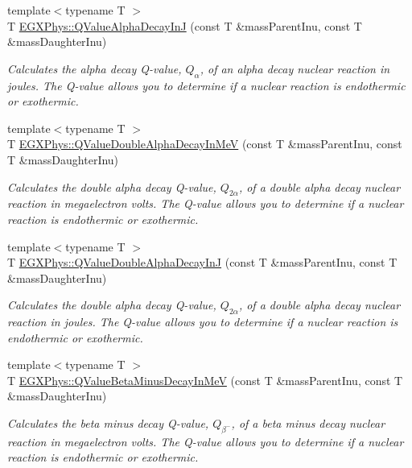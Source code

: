 \begin{DoxyCompactItemize}
{\footnotesize template$<$typename T $>$ }\\T \hyperlink{group___e_g_x_phys-_q_value_ga3e767be294dae24e1df18e7ccb8989e6}{E\+G\+X\+Phys\+::\+Q\+Value\+Alpha\+Decay\+InJ} (const T \&mass\+Parent\+Inu, const T \&mass\+Daughter\+Inu)
\begin{DoxyCompactList}\small\item\em Calculates the alpha decay Q-\/value, $Q_{\alpha}$, of an alpha decay nuclear reaction in joules. The Q-\/value allows you to determine if a nuclear reaction is endothermic or exothermic. \end{DoxyCompactList}\item 
{\footnotesize template$<$typename T $>$ }\\T \hyperlink{group___e_g_x_phys-_q_value_ga9bc6e8f493ee3769eb6eea0ac7cbdc61}{E\+G\+X\+Phys\+::\+Q\+Value\+Double\+Alpha\+Decay\+In\+MeV} (const T \&mass\+Parent\+Inu, const T \&mass\+Daughter\+Inu)
\begin{DoxyCompactList}\small\item\em Calculates the double alpha decay Q-\/value, $Q_{2\alpha}$, of a double alpha decay nuclear reaction in megaelectron volts. The Q-\/value allows you to determine if a nuclear reaction is endothermic or exothermic. \end{DoxyCompactList}\item 
{\footnotesize template$<$typename T $>$ }\\T \hyperlink{group___e_g_x_phys-_q_value_gaefd0ecd4ae3166d18a4748ff540e6bfc}{E\+G\+X\+Phys\+::\+Q\+Value\+Double\+Alpha\+Decay\+InJ} (const T \&mass\+Parent\+Inu, const T \&mass\+Daughter\+Inu)
\begin{DoxyCompactList}\small\item\em Calculates the double alpha decay Q-\/value, $Q_{2\alpha}$, of a double alpha decay nuclear reaction in joules. The Q-\/value allows you to determine if a nuclear reaction is endothermic or exothermic. \end{DoxyCompactList}\item 
{\footnotesize template$<$typename T $>$ }\\T \hyperlink{group___e_g_x_phys-_q_value_ga42468e998cf58a027a676755aa1339ba}{E\+G\+X\+Phys\+::\+Q\+Value\+Beta\+Minus\+Decay\+In\+MeV} (const T \&mass\+Parent\+Inu, const T \&mass\+Daughter\+Inu)
\begin{DoxyCompactList}\small\item\em Calculates the beta minus decay Q-\/value, $Q_{\beta^-}$, of a beta minus decay nuclear reaction in megaelectron volts. The Q-\/value allows you to determine if a nuclear reaction is endothermic or exothermic. \end{DoxyCompactList}\item 

\end{DoxyCompactItemize}
